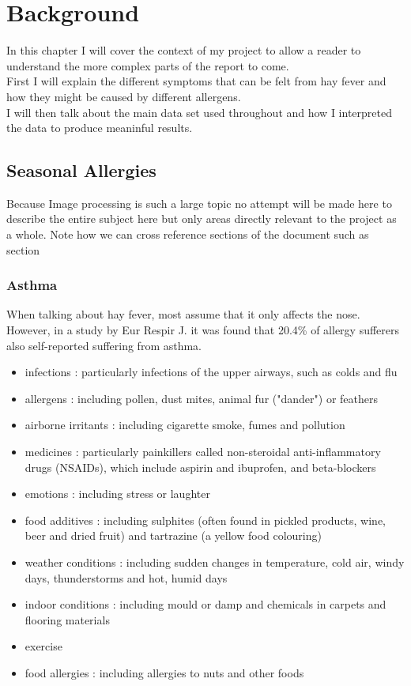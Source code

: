 \chapter{Background}
\label{cha:back}

In this chapter I will cover the context of my project to allow a reader to understand the more complex parts of the report to come.\\
First I will explain the different symptoms that can be felt from hay fever and how they might be caused by different allergens.\\
I will then talk about the main data set used throughout and how I interpreted the data to produce meaninful results.\\

\section{Seasonal Allergies}
Because Image processing is such a large topic no attempt will be made
here to describe the entire subject here but only areas directly
relevant to the project as a whole. Note how we can cross reference
sections of the document such as section

\subsection{Asthma}
When talking about hay fever, most assume that it only affects the nose. However, in a study by Eur Respir J. it was found that 20.4\% of allergy sufferers also self-reported suffering from asthma.\cite{rhinitis}\\

\begin{itemize}
  \item infections : particularly infections of the upper airways, such as colds and flu
  \item allergens : including pollen, dust mites, animal fur ("dander") or feathers
  \item airborne irritants : including cigarette smoke, fumes and pollution
  \item medicines : particularly painkillers called non-steroidal anti-inflammatory drugs (NSAIDs), which include aspirin and ibuprofen, and beta-blockers
  \item emotions : including stress or laughter
  \item food additives : including sulphites (often found in pickled products, wine, beer and dried fruit) and tartrazine (a yellow food colouring)
  \item weather conditions : including sudden changes in temperature, cold air, windy days, thunderstorms and hot, humid days
  \item indoor conditions : including mould or damp and chemicals in carpets and flooring materials
  \item exercise
  \item food allergies : including allergies to nuts and other foods
\end{itemize}

